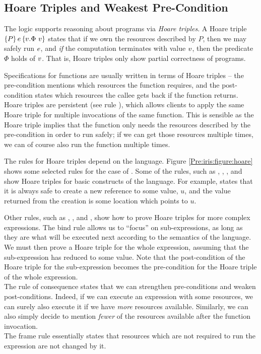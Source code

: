 \documentclass[a4paper, 10pt]{report}
\theoremstyle{definition}
\begin{document}
\subsection{Hoare Triples and Weakest Pre-Condition}
The logic supports reasoning about programs via \textit{Hoare triples}. A Hoare triple $\hoare{P}{\expr}{\val . \Phi ~ \val}$ states that if we own the resources described by $P$, then we may safely run $e$, and \emph{if} the computation terminates with value $v$, then the predicate $\Phi$ holds of $v$. That is, Hoare triples only show partial correctness of programs.

Specifications for functions are usually written in terms of Hoare triples -- the pre-condition mentions which resources the function requires, and the post-condition states which resources the callee gets back if the function returns. Hoare triples are persistent (see rule ), which allows clients to apply the same Hoare triple for multiple invocations of the same function. This is sensible as the Hoare triple implies that the function only needs the resources described by the pre-condition in order to run safely; if we can get those resources multiple times, we can of course also run the function multiple times.

The rules for Hoare triples depend on the language. Figure \ref{Pre:iris:figure:hoare} shows some selected rules for the case of \heaplang{}. Some of the rules, such as , , , and  show Hoare triples for basic constructs of the language. For example,  states that it is always safe to create a new reference to some value, $u$, and the value returned from the creation is some location which points to $u$.

Other rules, such as , , and , show how to prove Hoare triples for more complex expressions. The bind rule allows us to ``focus'' on sub-expressions, as long as they are what will be executed next according to the semantics of the language. We must then prove a Hoare triple for the whole expression, assuming that the sub-expression has reduced to some value. Note that the post-condition of the Hoare triple for the sub-expression becomes the pre-condition for the Hoare triple of the whole expression.\\
The rule of consequence states that we can strengthen pre-conditions and weaken post-conditions. Indeed, if we can execute an expression with some resources, we can surely also execute it if we have \emph{more} resources available. Similarly, we can also simply decide to mention \emph{fewer} of the resources available after the function invocation.\\
The frame rule essentially states that resources which are not required to run the expression are not changed by it.
\end{document}
